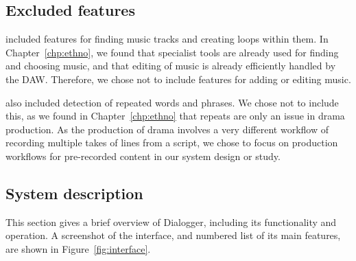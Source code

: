 \subsection{Excluded features}


\citet{Rubin2013} included features for finding music tracks and creating loops within them.  In
Chapter~\ref{chp:ethno}, we found that specialist tools are already used for finding and choosing music, and that
editing of music is already efficiently handled by the DAW. Therefore, we chose not to include features for adding or
editing music. 

\citet{Rubin2013} also included detection of repeated words and phrases. We chose not to include this, as we found in
Chapter~\ref{chp:ethno} that repeats are only an issue in drama production. As the production of drama involves a very
different workflow of recording multiple takes of lines from a script, we chose to focus on production workflows for
pre-recorded content in our system design or study.


\subsection{System description}

This section gives a brief overview of Dialogger, including its functionality and operation.  A screenshot of the
interface, and numbered list of its main features, are shown in Figure~\ref{fig:interface}.

